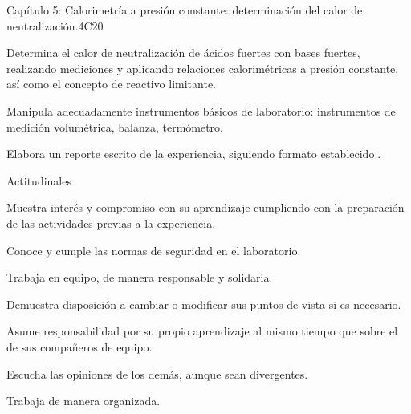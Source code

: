 \begin{syllabus}
\begin{unit}{Capítulo 5:  Calorimetría a presión constante: determinación del calor de neutralización.}{}{}{4}{C20}
\begin{topics}
      \item Determina el calor de neutralización de ácidos fuertes con bases fuertes, realizando mediciones y aplicando relaciones calorimétricas a presión constante, así como el concepto de reactivo limitante.
      \item Manipula adecuadamente instrumentos básicos de laboratorio: instrumentos de medición volumétrica, balanza, termómetro.
      \item Elabora un reporte escrito de la experiencia, siguiendo formato establecido..
   \end{topics}
   
   Actitudinales

\begin{topics}
      \item Muestra interés y compromiso con su aprendizaje cumpliendo con la preparación de las actividades previas a la experiencia.
	  \item Conoce y cumple las normas de seguridad en el laboratorio.
	  \item Trabaja en equipo, de manera responsable y solidaria.
	  \item Demuestra disposición a cambiar o modificar sus puntos de vista si es necesario.
	  \item Asume responsabilidad por su propio aprendizaje al mismo tiempo que sobre el de sus compañeros de equipo.
	  \item Escucha las opiniones de los demás, aunque sean divergentes.
	  \item Trabaja de manera organizada.
   \end{topics}

   \begin{learningoutcomes}
      \item 
   \end{learningoutcomes}
   
\end{unit}

\begin{coursebibliography}
\end{coursebibliography}



\end{syllabus}